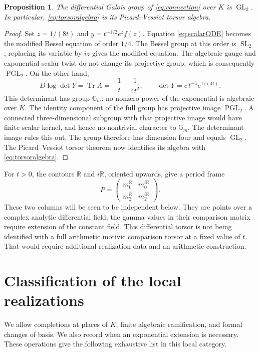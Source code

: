 \documentclass[11pt]{article}
\newtheorem{proposition}[theorem]{Proposition}
\theoremstyle{definition}
\newcommand{\GL}{\operatorname{GL}}
\newcommand{\SL}{\operatorname{SL}}
\newcommand{\Tr}{\operatorname{Tr}}
\numberwithin{equation}{section}
\begin{document}
\begin{proposition}\label{prop:galois}
The differential Galois group of \eqref{eq:connection} over $K$ is
$\GL_2$. In particular, \eqref{eq:torsoralgebra} is its Picard--Vessiot
torsor algebra.
\end{proposition}
\begin{proof}
Set $z=1/(8t)$ and $y=t^{-1/2}e^z f(z)$. Equation
\eqref{eq:scalarODE} becomes the modified Bessel equation of order
$1/4$. The Bessel group at this order is $\SL_2$
\cite[Example 1.3.32]{Singer}; replacing its variable by $iz$ gives the
modified equation. The algebraic gauge and exponential scalar twist do
not change its projective group, which is consequently $\operatorname{PGL}_2$.
On the other hand,
\begin{equation}\label{eq:wronskian}
 D\log\det Y=\Tr A=-\frac1t-\frac1{4t^2},\qquad
 \det Y=c\,t^{-1}e^{1/(4t)}.
\end{equation}
This determinant has group $\mathbb G_m$: no nonzero power of the
exponential is algebraic over $K$. The identity component of the full
group has projective image $\operatorname{PGL}_2$. A connected
three-dimensional subgroup with that projective image would have finite
scalar kernel, and hence no nontrivial character to $\mathbb G_m$.
The determinant image rules this out. The group therefore has dimension
four and equals $\GL_2$. The Picard--Vessiot torsor theorem
\cite[Proposition 1.3.20]{Singer} now identifies its algebra with
\eqref{eq:torsoralgebra}.
\end{proof}

For $t>0$, the contours $\mathbb R$ and $i\mathbb R$, oriented upwards,
give a period frame
\begin{equation}\label{eq:periodmatrix}
 P=\begin{pmatrix}m_0^{\mathbb R}&m_0^{i\mathbb R}\\
 m_2^{\mathbb R}&m_2^{i\mathbb R}\end{pmatrix}.
\end{equation}
These two columns will be seen to be independent below. They are points
over a complex analytic differential field; the gamma values in their
comparison matrix require extension of the constant field.
This differential torsor is not being identified with a full arithmetic
motivic comparison torsor at a fixed value of $t$. That would require
additional realization data and an arithmetic construction.

\section{Classification of the local realizations}\label{sec:local}
We allow completions at places of $K$, finite algebraic ramification,
and formal changes of basis. We also record when an exponential extension
is necessary. These operations give the following exhaustive list in
this local category.
\end{document}
